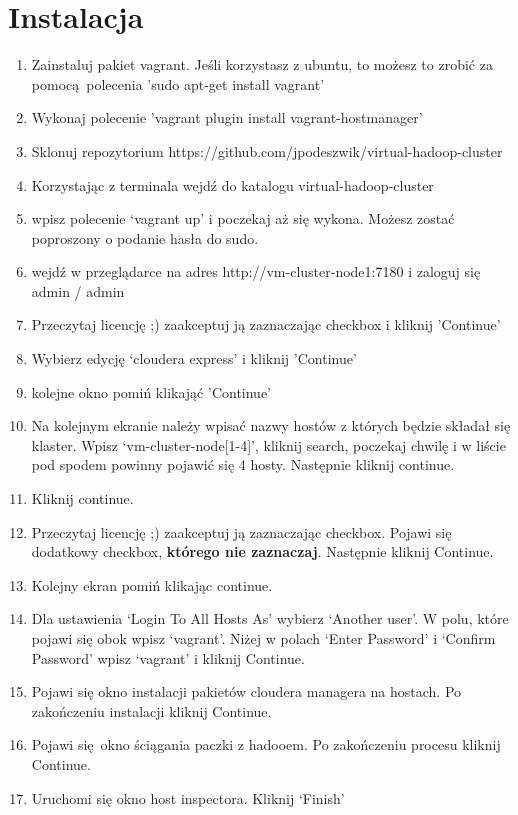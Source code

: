 \documentclass[11pt]{article}
\begin{document}
\section*{Instalacja}

\begin{enumerate}
\item Zainstaluj pakiet vagrant. Jeśli korzystasz z ubuntu, to możesz to zrobić za pomocą polecenia 'sudo apt-get install vagrant'
\item Wykonaj polecenie 'vagrant plugin install vagrant-hostmanager'
\item Sklonuj repozytorium https://github.com/jpodeszwik/virtual-hadoop-cluster
\item Korzystając z terminala wejdź do katalogu virtual-hadoop-cluster
\item wpisz polecenie ‘vagrant up’ i poczekaj aż się wykona. Możesz zostać poproszony o podanie hasła do sudo.
\item wejdź w przeglądarce na adres http://vm-cluster-node1:7180 i zaloguj się admin / admin
\item Przeczytaj licencję ;) zaakceptuj ją zaznaczając checkbox i kliknij 'Continue'
\item Wybierz edycję ‘cloudera express’ i kliknij 'Continue'
\item kolejne okno pomiń klikająć 'Continue'
\item Na kolejnym ekranie należy wpisać nazwy hostów z których będzie składał się klaster. Wpisz ‘vm-cluster-node[1-4]’, kliknij search, poczekaj chwilę i w liście pod spodem powinny pojawić się 4 hosty. Następnie kliknij continue.
\item Kliknij continue.
\item Przeczytaj licencję ;) zaakceptuj ją zaznaczając checkbox. Pojawi się dodatkowy checkbox, \textbf{którego nie zaznaczaj}. Następnie kliknij Continue.
\item Kolejny ekran pomiń klikając continue.
\item Dla ustawienia ‘Login To All Hosts As’ wybierz ‘Another user’. W polu, które pojawi się obok wpisz ‘vagrant’. Niżej w polach ‘Enter Password’ i ‘Confirm Password’ wpisz ‘vagrant’ i kliknij Continue.
\item Pojawi się okno instalacji pakietów cloudera managera na hostach. Po zakończeniu instalacji kliknij Continue.
\item Pojawi się okno ściągania paczki z hadooem. Po zakończeniu procesu kliknij Continue.
\item Uruchomi się okno host inspectora. Kliknij ‘Finish’

\end{enumerate}
\end{document}
